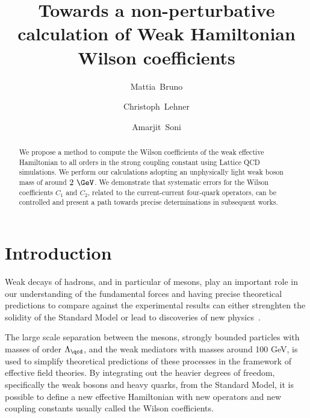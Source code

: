 \documentclass[aps,prd,twocolumn,nofootinbib,showpacs,superscriptaddress]{revtex4-1}
\begin{document}
\title{Towards a non-perturbative calculation of Weak Hamiltonian Wilson coefficients}

\author{Mattia~Bruno}

\author{Christoph~Lehner}

\author{Amarjit~Soni}


\begin{abstract}
We propose a method to compute the Wilson coefficients 
of the weak effective Hamiltonian 
to all orders in the strong coupling constant using 
Lattice QCD simulations. 
We perform our calculations adopting
an unphysically light weak boson mass of around $2~\GeV$.
We demonstrate that systematic errors for
the Wilson coefficients
$C_1$ and $C_2$, related to the current-current four-quark operators,
can be controlled and present a path towards
precise determinations in subsequent works.
\end{abstract}

\maketitle

\section{Introduction}

Weak decays of hadrons, and in particular of mesons, 
play an important role in our understanding of the fundamental forces 
and having precise theoretical predictions to compare against the experimental results
can either strenghten the solidity of the Standard Model or lead to discoveries of new 
physics~\cite{Buras:2016hkx}.

The large scale separation between the mesons, strongly bounded particles with 
masses of order $\Lambda_\qcd$, and the weak mediators with masses around 100 GeV, 
is used to simplify theoretical predictions 
of these processes in the framework
of effective field theories.
By integrating out the heavier degrees of freedom, specifically the weak bosons and 
heavy quarks, from the Standard Model, it is possible to define a new effective Hamiltonian
with new operators and new coupling constants 
usually called the Wilson coefficients.
\end{document}
